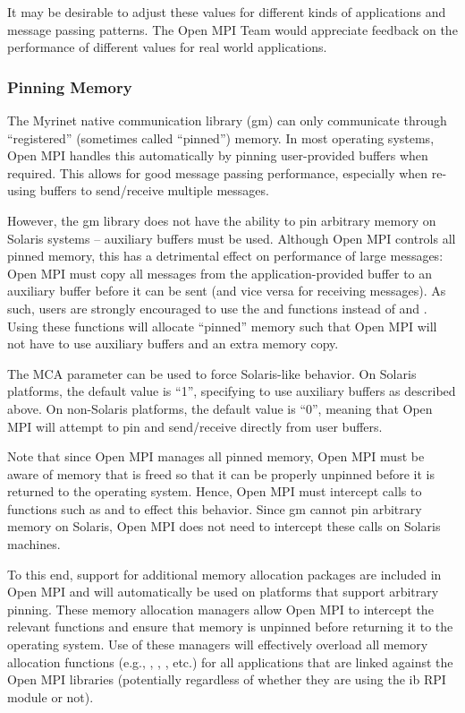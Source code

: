 It may be desirable to adjust these values for different kinds of
applications and message passing patterns.  The Open MPI Team would
appreciate feedback on the performance of different values for real
world applications.


\subsubsection{Pinning Memory}
\label{sec:mca-ompi-gm-ptmalloc}

The Myrinet native communication library (gm) can only communicate
through ``registered'' (sometimes called ``pinned'') memory.  In most
operating systems, Open MPI handles this automatically by pinning
user-provided buffers when required.  This allows for good message
passing performance, especially when re-using buffers to send/receive
multiple messages.

However, the gm library does not have the ability to pin arbitrary
memory on Solaris systems -- auxiliary buffers must be used.  Although
Open MPI controls all pinned memory, this has a detrimental effect on
performance of large messages: Open MPI must copy all messages from the
application-provided buffer to an auxiliary buffer before it can be
sent (and vice versa for receiving messages).  As such, users are
strongly encouraged to use the  and
 functions instead of  and
.  Using these functions will allocate ``pinned'' memory
such that Open MPI will not have to use auxiliary buffers and an extra
memory copy.

The  MCA parameter can be used to force
Solaris-like behavior.  On Solaris platforms, the default value is
``1'', specifying to use auxiliary buffers as described above.  On
non-Solaris platforms, the default value is ``0'', meaning that
Open MPI will attempt to pin and send/receive directly from user
buffers.

Note that since Open MPI manages all pinned memory, Open MPI must be
aware of memory that is freed so that it can be properly unpinned
before it is returned to the operating system.  Hence, Open MPI must
intercept calls to functions such as  and 
to effect this behavior.  Since gm cannot pin arbitrary memory on
Solaris, Open MPI does not need to intercept these calls on Solaris
machines.

To this end, support for additional memory allocation packages are
included in Open MPI and will automatically be used on platforms that
support arbitrary pinning.  These memory allocation managers allow
Open MPI to intercept the relevant functions and ensure that memory is
unpinned before returning it to the operating system.  Use of these
managers will effectively overload all memory allocation functions
(e.g., , , , etc.) for all
applications that are linked against the Open MPI libraries
(potentially regardless of whether they are using the ib RPI module or
not).  

